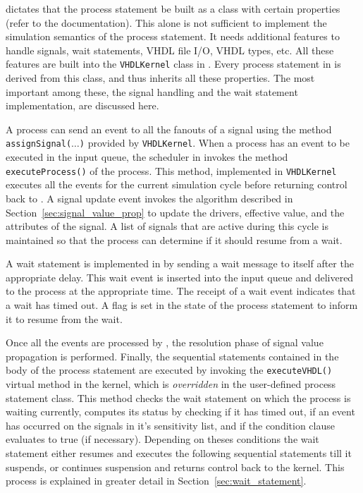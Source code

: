 \documentclass[11pt]{article}
\begin{document}
\warped\/ dictates that the process statement be built as a class with
certain properties (refer to the \warped\/ documentation). This alone
is not sufficient to implement the simulation semantics of the process
statement.  It needs additional features to handle signals, wait
statements, VHDL file I/O, VHDL types, etc.  All these features are
built into the \texttt{VHDLKernel} class in \tyvis.  Every process
statement in \tyvis\/ is derived from this class, and thus inherits
all these properties.  The most important among these, the signal
handling and the wait statement implementation, are discussed here.

A process can send an event to all the fanouts of a signal using the
method \texttt{assignSignal($\ldots$)} provided by
\texttt{VHDLKernel}.  When a process has an event to be executed in
the input queue, the scheduler in \warped\/ invokes the method
\texttt{executeProcess()} of the process.  This method, implemented in
\texttt{VHDLKernel} executes all the events for the current simulation
cycle before returning control back to \warped.  A signal update event
invokes the algorithm described in Section~\ref{sec:signal_value_prop}
to update the drivers, effective value, and the attributes of the
signal.  A list of signals that are active during this cycle is
maintained so that the process can determine if it should resume from
a wait.

A wait statement is implemented in \tyvis\/ by sending a wait message
to itself after the appropriate delay.  This wait event is inserted
into the input queue and delivered to the process at the appropriate
time.  The receipt of a wait event indicates that a wait has timed
out.  A flag is set in the state of the process statement to inform it
to resume from the wait.

Once all the events are processed by \tyvis, the resolution phase of
signal value propagation is performed.  Finally, the sequential
statements contained in the body of the process statement are executed
by invoking the \texttt{executeVHDL()} virtual method in the kernel,
which is \textit{overridden} in the user-defined process statement
class.  This method checks the wait statement on which the process is
waiting currently, computes its status by checking if it has timed
out, if an event has occurred on the signals in it's sensitivity list,
and if the condition clause evaluates to true (if necessary).
Depending on theses conditions the wait statement either resumes and
executes the following sequential statements till it suspends, or
continues suspension and returns control back to the \tyvis\/ kernel.
This process is explained in greater detail in
Section~\ref{sec:wait_statement}.
\end{document}
